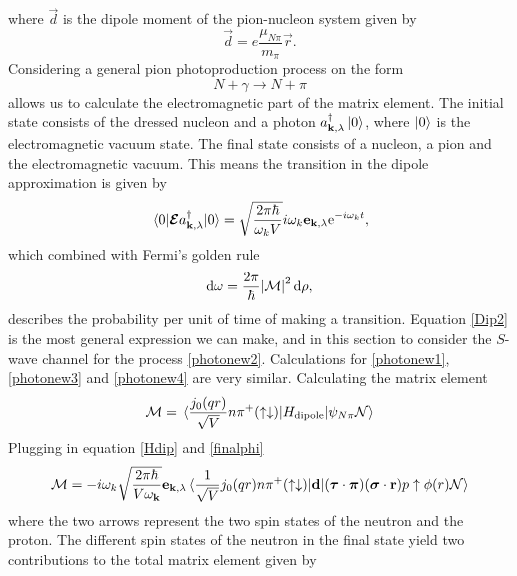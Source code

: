 where $\vec{d}$ is the dipole moment of the pion-nucleon system given by 
\begin{equation}\label{dipolemoment}
	\vec{d}=e\frac{\mu_{N\pi}}{m_\pi}\vec{r}.
\end{equation}
Considering a general pion photoproduction process on the form
\begin{equation}\label{General}
	N+\gamma \rightarrow N+\pi
\end{equation}
allows us to calculate the electromagnetic part of the matrix element. The initial state consists of the dressed nucleon and a photon $a_{\bm{\mathrm{k}},\lambda}^\dagger \ket{0}$, where $\ket{0}$ is the electromagnetic vacuum state. The final state consists of a nucleon, a pion and the electromagnetic vacuum. This means the transition in the dipole approximation is given by 
\begin{equation}\label{Dip2}
	\mel{0}{\bm{\mathrm{\mathcal{E}}}a_{\bm{\mathrm{k}},\lambda}^\dagger}{0} = \sqrt{\frac{2\pi\hbar}{\omega_k V}}i\omega_k \bm{\mathrm{e}}_{\bm{\mathrm{k}},\lambda}\text{e}^{-i\omega_k t},
\end{equation}
which combined with Fermi's golden rule
\begin{equation}\label{FermiGoldenRule}
	\text{d}\omega = \frac{2\pi}{\hbar}\abs{\mathcal{M}}^2 \text{d}\rho,
\end{equation}
describes the probability per unit of time of making a transition. Equation \eqref{Dip2} is the most general expression we can make, and in this section to consider the $S$-wave channel for the process \eqref{photonew2}. Calculations for \eqref{photonew1}, \eqref{photonew3} and \eqref{photonew4} are very similar. Calculating the matrix element
\begin{equation}\label{Hdip}
	\mathcal{M}=\mel*{\frac{j_0(qr)}{\sqrt{V}}n\pi^+(\uparrow\downarrow)}{H_\text{dipole}}{\psi_{N\pi}\mathcal{N}}
\end{equation}
Plugging in equation \eqref{Hdip} and \eqref{finalphi}
\begin{align}
	\mathcal{M} =-i\omega_k\sqrt{\frac{2\pi\hbar}{V\omega_{\bm{\mathrm{k}}}}}\bm{\mathrm{e}}_{\bm{\mathrm{k}},\lambda}\mel*{\frac{1}{\sqrt{V}} j_0(qr)n\pi^+ (\uparrow \downarrow)}{\bm{\mathrm{d}}}{(\bm{\mathrm{\tau}}\cdot \bm{\mathrm{\pi}})(\bm{\mathrm{\sigma}}\cdot \bm{\mathrm{r}})p\uparrow \phi(r)\mathcal{N}}
\end{align}
where the two arrows represent the two spin states of the neutron and the proton. The different spin states of the neutron in the final state yield two contributions to the total matrix element given by
